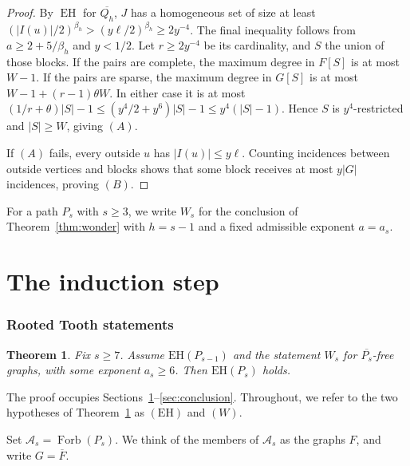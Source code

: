 \documentclass[11pt,a4paper]{article}
\newtheorem{theorem}{Theorem}[section]
\theoremstyle{definition}
\theoremstyle{remark}
\numberwithin{equation}{section}
\DeclareMathOperator{\Forb}{Forb}
\newcommand{\EH}{\mathrm{EH}}
\begin{document}
\begin{proof}
By \(\operatorname{EH}\) for \(\overline{Q_{h}}\), \(J\) has a homogeneous set of size at least \((|I(u)|/2)^{\beta_{h}} > (y \ell/2)^{\beta_{h}} \ge\allowbreak  2 y^{-4}\). The final inequality follows from \(a\ge\allowbreak 2+5/\beta_{h}\) and \(y<1/2\). Let \(r\ge\allowbreak 2 y^{-4}\) be its cardinality, and \(S\) the union of those blocks. If the pairs are complete, the maximum degree in \(F[S]\) is at most \(W-1\). If the pairs are sparse, the maximum degree in \(G[S]\) is at most \(W-1+(r-1)\theta W\). In either case it is at most \((1/r+\theta)|S|-1 \le\allowbreak  (y^{4}/2+y^{6})|S|-1 \le\allowbreak  y^{4}(|S|-1)\). Hence \(S\) is \(y^{4}\)-restricted and \(|S|\ge\allowbreak W\), giving \((A)\).

If \((A)\) fails, every outside \(u\) has \(|I(u)|\le\allowbreak y \ell\). Counting incidences between outside vertices and blocks shows that some block receives at most \(y|G|\) incidences, proving \((B)\).
\end{proof}
For a path \(P_s\) with \(s\ge3\), we write \(W_s\) for the conclusion of Theorem~\ref{thm:wonder} with \(h=s-1\) and a fixed admissible exponent \(a=a_s\).


\part{The induction step}

\section{Rooted Tooth statements}\label{sec:ambient}
\begin{theorem}\label{thm:step}Fix \(s\ge7\). Assume \(\EH(P_{s-1})\) and the statement \(W_s\) for \(\overline{P_s}\)-free graphs, with some exponent \(a_s\ge6\). Then \(\EH(P_s)\) holds.\end{theorem}
The proof occupies Sections~\ref{sec:ambient}--\ref{sec:conclusion}. Throughout, we refer to the two hypotheses of Theorem~\ref{thm:step} as \((\EH)\) and \((W)\).

Set \(\mathcal{A}_{s}=\Forb(P_{s})\). We think of the members of \(\mathcal A_s\) as the graphs \(F\), and write \(G=\overline{F}\).
\end{document}
